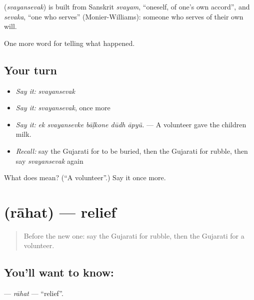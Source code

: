 \begin{cousinweb}
\textbf{} (\emph{svayansevak}) is built from Sanskrit \emph{svayam}, \textquotedblleft{}oneself, of one's own accord\textquotedblright{}, and \emph{sevaka}, \textquotedblleft{}one who serves\textquotedblright{} (Monier-Williams): someone who serves of their own will.
\end{cousinweb}

\begin{grammarlens}[title={What you've built}]
One more word for telling what happened.
\end{grammarlens}

\subsection*{Your turn}
\begin{itemize}
\raggedright
  \item \emph{Say it:} \emph{svayansevak}
  \item \emph{Say it:} \emph{svayansevak}, once more
  \item \emph{Say it:} \emph{ek svayansevke bāḷkone dūdh āpyũ.} — A volunteer gave the children milk.
  \item \emph{Recall:} say the Gujarati for to be buried, then the Gujarati for rubble, then say \emph{svayansevak} again
\end{itemize}

\begin{tcolorbox}[breakable,colback=teal!4,colframe=teal!35!black,title={Before you move on}]
What does  mean? (\textquotedblleft{}A volunteer\textquotedblright{}.) Say it once more.
\end{tcolorbox}
\section[\texorpdfstring{\gu{રાહત} (rāhat)}{રાહત (rāhat)}]{ (rāhat) — relief}

\label{lesson:GU-C306-rahat}



\begin{quote}
Before the new one: say the Gujarati for rubble, then the Gujarati for a volunteer.
\end{quote}

\subsection*{You'll want to know: }
\textbf{} — \emph{rāhat} — \textquotedblleft{}relief\textquotedblright{}.

